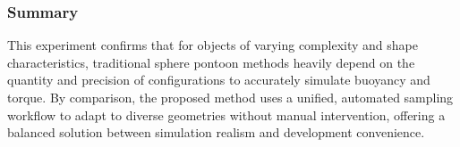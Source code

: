 \subsubsection*{Summary}

This experiment confirms that for objects of varying complexity and shape characteristics, traditional sphere pontoon methods heavily depend on the quantity and precision of configurations to accurately simulate buoyancy and torque.  
By comparison, the proposed method uses a unified, automated sampling workflow to adapt to diverse geometries without manual intervention, offering a balanced solution between simulation realism and development convenience.